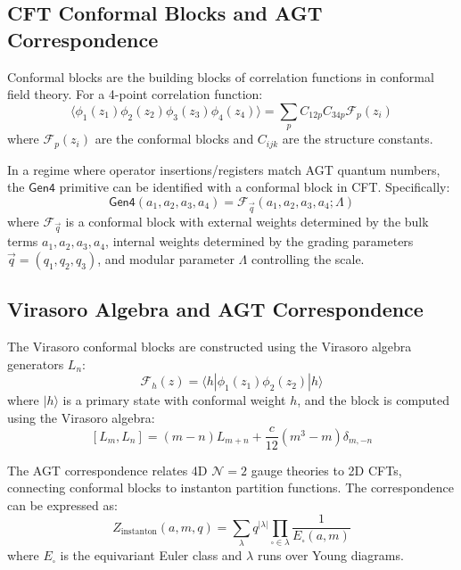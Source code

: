 \subsection{CFT Conformal Blocks and AGT Correspondence}

\begin{definition}
\label{def:conformal-blocks}
Conformal blocks are the building blocks of correlation functions in conformal field theory. For a 4-point correlation function:
\[
\langle \phi_1(z_1) \phi_2(z_2) \phi_3(z_3) \phi_4(z_4) \rangle = \sum_p C_{12p} C_{34p} \mathcal{F}_p(z_i)
\]
where $\mathcal{F}_p(z_i)$ are the conformal blocks and $C_{ijk}$ are the structure constants.
\end{definition}

\begin{proposition}
\label{thm:g6-conformal}
In a regime where operator insertions/registers match AGT quantum numbers, the $\mathsf{Gen4}$ primitive can be identified with a conformal block in CFT. Specifically:
\[
\mathsf{Gen4}(a_1, a_2, a_3, a_4) = \mathcal{F}_{\vec{q}}(a_1, a_2, a_3, a_4; \Lambda)
\]
where $\mathcal{F}_{\vec{q}}$ is a conformal block with external weights determined by the bulk terms $a_1, a_2, a_3, a_4$, internal weights determined by the grading parameters $\vec{q} = (q_1, q_2, q_3)$, and modular parameter $\Lambda$ controlling the scale.
\end{proposition}

\subsection{Virasoro Algebra and AGT Correspondence}

\begin{definition}
\label{def:virasoro-blocks}
The Virasoro conformal blocks are constructed using the Virasoro algebra generators $L_n$:
\[
\mathcal{F}_h(z) = \langle h | \phi_1(z_1) \phi_2(z_2) | h \rangle
\]
where $|h\rangle$ is a primary state with conformal weight $h$, and the block is computed using the Virasoro algebra:
\[
[L_m, L_n] = (m-n)L_{m+n} + \frac{c}{12}(m^3-m)\delta_{m,-n}
\]
\end{definition}

\begin{definition}
\label{def:agt-correspondence}
The AGT correspondence relates 4D $\mathcal{N}=2$ gauge theories to 2D CFTs, connecting conformal blocks to instanton partition functions. The correspondence can be expressed as:
\[
Z_{\text{instanton}}(a, m, q) = \sum_{\lambda} q^{|\lambda|} \prod_{\square \in \lambda} \frac{1}{E_{\square}(a, m)}
\]
where $E_{\square}$ is the equivariant Euler class and $\lambda$ runs over Young diagrams.
\end{definition}

